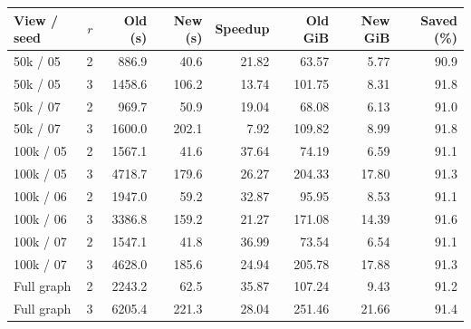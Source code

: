 \begin{tabular}{@{}lrrrrrrr@{}}
\toprule
View / seed & $r$ & Old (s) & New (s) & Speedup & Old GiB & New GiB & Saved (\%) \\
\midrule
50k / 05 & 2 & 886.9 & 40.6 & 21.82 & 63.57 & 5.77 & 90.9 \\
50k / 05 & 3 & 1458.6 & 106.2 & 13.74 & 101.75 & 8.31 & 91.8 \\
50k / 07 & 2 & 969.7 & 50.9 & 19.04 & 68.08 & 6.13 & 91.0 \\
50k / 07 & 3 & 1600.0 & 202.1 & 7.92 & 109.82 & 8.99 & 91.8 \\
100k / 05 & 2 & 1567.1 & 41.6 & 37.64 & 74.19 & 6.59 & 91.1 \\
100k / 05 & 3 & 4718.7 & 179.6 & 26.27 & 204.33 & 17.80 & 91.3 \\
100k / 06 & 2 & 1947.0 & 59.2 & 32.87 & 95.95 & 8.53 & 91.1 \\
100k / 06 & 3 & 3386.8 & 159.2 & 21.27 & 171.08 & 14.39 & 91.6 \\
100k / 07 & 2 & 1547.1 & 41.8 & 36.99 & 73.54 & 6.54 & 91.1 \\
100k / 07 & 3 & 4628.0 & 185.6 & 24.94 & 205.78 & 17.88 & 91.3 \\
Full graph & 2 & 2243.2 & 62.5 & 35.87 & 107.24 & 9.43 & 91.2 \\
Full graph & 3 & 6205.4 & 221.3 & 28.04 & 251.46 & 21.66 & 91.4 \\
\bottomrule
\end{tabular}
